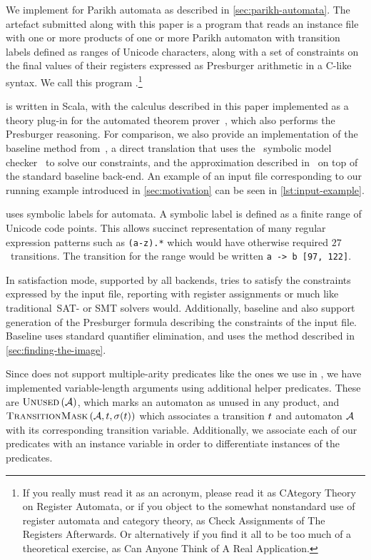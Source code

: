 \documentclass[acmsmall,review,anonymous,screen]{acmart}\settopmatter{printfolios=true,printccs=true,printacmref=true}
\theoremstyle{definition}
\begin{document}
We implement \Calculus{} for Parikh automata as described in
\cref{sec:parikh-automata}. The artefact submitted along with this paper is a
program that reads an instance file with one or more products of one or more
Parikh automaton with transition labels defined as ranges of Unicode characters,
along with a set of constraints on the final values of their registers expressed
as Presburger arithmetic in a C-like syntax. We call this program
\Catra.\footnote{If you really must read it as an acronym, please read it as
CAtegory Theory on Register Automata, or if you object to the somewhat
nonstandard use of register automata and category theory, as Check Assignments
of The Registers Afterwards. Or alternatively if you find it all to be too much
of a theoretical exercise, as Can Anyone Think of A Real Application.}

\Catra{} is written in Scala, with the calculus described in this paper
implemented as a theory plug-in for the \Princess{} automated theorem
prover~\cite{princess}, which also performs the Presburger reasoning. For
comparison, we also provide an implementation of the baseline method
from~\cite{generate-parikh-image}, a direct translation that uses the~\Nuxmv{}
symbolic model checker~\cite{nuxmv} to solve our constraints, and the
approximation described in~\cite{approximate-parikh} on top of the standard
baseline back-end. An example of an input file corresponding to our running
example introduced in \cref{sec:motivation} can be seen in
\cref{lst:input-example}.

\Catra{} uses symbolic labels for automata. A symbolic label is defined as a
finite range of Unicode code points. This allows succinct representation of many
regular expression patterns such as \lstinline{(a-z).*} which would have
otherwise required $27$~transitions. The transition for the range would be
written \lstinline{a -> b [97, 122]}.

In satisfaction mode, supported by all backends, \Catra{} tries to satisfy the
constraints expressed by the input file, reporting \Sat{} with register
assignments or \Unsat{} much like traditional~SAT- or SMT solvers would.
Additionally, baseline and \Calculus{} also support generation of the Presburger
formula describing the constraints of the input file. Baseline uses standard
quantifier elimination, and \Calculus{} uses the method described in
\cref{sec:finding-the-image}.

Since \Princess{} does not support multiple-arity predicates like the ones we
use in \Calculus{}, we have implemented variable-length arguments using
additional helper predicates. These are $\operatorname{\textsc{Unused}}{}(\mathcal{A})$, which marks an
automaton as unused in any product, and $\operatorname{\textsc{TransitionMask}}{}(\mathcal{A},
t, \operatorname{\sigma}(t))$ which associates a transition $t$
and automaton $\mathcal{A}$ with its corresponding transition variable.
Additionally, we associate each of our predicates with an instance variable in
order to differentiate instances of the predicates.
\end{document}
